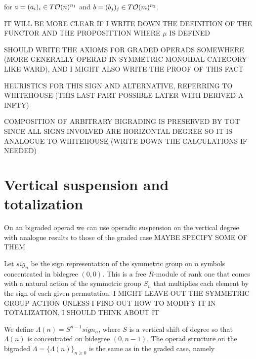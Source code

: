 \documentclass[twoside]{article}
\begin{document}
for $a=(a_i)_i\in T{\mathcal O}(n)^{n_1}$ and $b=(b_j)_j\in T{\mathcal O}(m)^{n_2}$.

IT WILL BE MORE CLEAR IF I WRITE DOWN THE DEFINITION OF THE FUNCTOR AND THE PROPOSITTION WHERE $\mu$ IS DEFINED



SHOULD WRITE THE AXIOMS FOR GRADED OPERADS SOMEWHERE (MORE GENERALLY OPERAD IN SYMMETRIC MONOIDAL CATEGORY LIKE WARD), AND I MIGHT ALSO WRITE THE PROOF OF THIS FACT

HEURISTICS FOR THIS SIGN AND ALTERNATIVE, REFERRING TO WHITEHOUSE (THIS  LAST PART POSSIBLE LATER WITH DERIVED A INFTY)


COMPOSITION OF ARBITRARY BIGRADING IS PRESERVED BY TOT SINCE ALL SIGNS INVOLVED ARE HORIZONTAL DEGREE SO IT IS ANALOGUE TO WHITEHOUSE (WRITE DOWN THE CALCULATIONS IF NEEDED)

\section{Vertical suspension and totalization}
On an bigraded operad we can use operadic suspension on the vertical degree with analogue results to those of the graded case MAYBE SPECIFY SOME OF THEM



Let $sig_n$ be the sign representation of the symmetric group on $n$ symbols concentrated in bidegree $(0,0)$. This is a free $R$-module of rank one that comes with a natural action of the symmetric group $S_n$ that multiplies each element by the sign of each given permutation. I MIGHT LEAVE OUT THE SYMMETRIC GROUP  ACTION UNLESS I FIND OUT HOW TO MODIFY IT IN TOTALIZATION, I SHOULD THINK ABOUT IT

We define $\Lambda(n)=S^{n-1}sign_n$, where  $S$ is a vertical shift of degree so that $\Lambda(n)$ is concentrated on bidegree  $(0,n-1)$.
The operad structure on the bigraded $\Lambda=\{\Lambda(n)\}_{n\geq 0}$ is the same as in the graded case, namely
\end{document}
